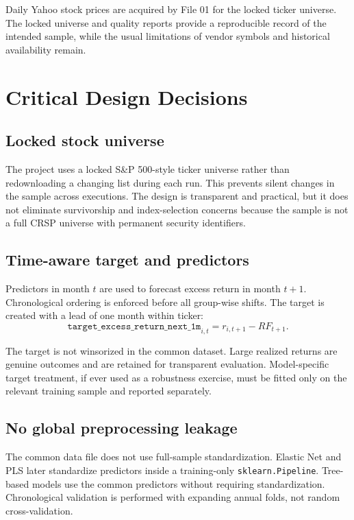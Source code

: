 \documentclass[11pt,a4paper]{article}
\newcommand{\code}[1]{\texttt{#1}}
\newcommand{\target}{\code{target\_excess\_return\_next\_1m}}
\begin{document}
Daily Yahoo stock prices are acquired by File 01 for the locked ticker universe. The locked universe and quality reports provide a reproducible record of the intended sample, while the usual limitations of vendor symbols and historical availability remain.

\section{Critical Design Decisions}

\subsection{Locked stock universe}

The project uses a locked S\&P 500-style ticker universe rather than redownloading a changing list during each run. This prevents silent changes in the sample across executions. The design is transparent and practical, but it does not eliminate survivorship and index-selection concerns because the sample is not a full CRSP universe with permanent security identifiers.

\subsection{Time-aware target and predictors}

Predictors in month $t$ are used to forecast excess return in month $t+1$. Chronological ordering is enforced before all group-wise shifts. The target is created with a lead of one month within ticker:
\[
  \target_{i,t}=r_{i,t+1}-RF_{t+1}.
\]

The target is not winsorized in the common dataset. Large realized returns are genuine outcomes and are retained for transparent evaluation. Model-specific target treatment, if ever used as a robustness exercise, must be fitted only on the relevant training sample and reported separately.

\subsection{No global preprocessing leakage}

The common data file does not use full-sample standardization. Elastic Net and PLS later standardize predictors inside a training-only \code{sklearn.Pipeline}. Tree-based models use the common predictors without requiring standardization. Chronological validation is performed with expanding annual folds, not random cross-validation.
\end{document}
